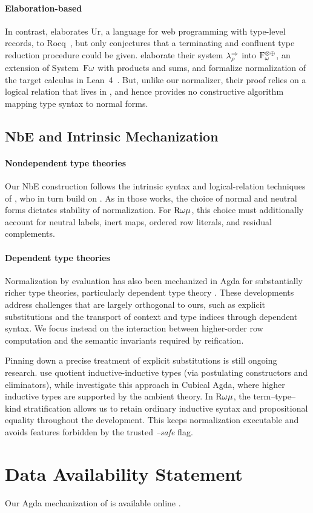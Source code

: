 \documentclass[sigplan,screen]{acmart}
\begin{document}
\paragraph{Elaboration-based} In contrast,  elaborates Ur, a language for web programming with type-level records, to Rocq~\citep{Rocq}, but only conjectures that a terminating and confluent type reduction procedure could be given.  elaborate their system $\lambda_{\rho}^{\Rightarrow}{}$ into $\textrm{F$_{\omega}^{\otimes\oplus}$}{}$, an extension of System~$\textrm{F$\omega$}$ with products and sums, and formalize normalization of the target calculus in Lean~4~\citep{Lean4}. But, unlike our normalizer, their proof relies on a logical relation that lives in , and hence provides no constructive algorithm mapping type syntax to normal forms. 

\subsection{NbE and Intrinsic Mechanization}

\paragraph{Nondependent type theories}
Our NbE construction follows the intrinsic syntax and logical-relation techniques of , who in turn build on . As in those works, the choice of normal and neutral forms dictates stability of normalization. For $\Rome$, this choice must additionally account for neutral labels, inert maps, ordered row literals, and residual complements.

\paragraph{Dependent type theories}
Normalization by evaluation has also been mechanized in Agda for substantially richer type theories, particularly dependent type theory \citep{Abel13,AbelC14,AbelAHPMSS19}. These developments address challenges that are largely orthogonal to ours, such as explicit substitutions and the transport of context and type indices through dependent syntax. We focus instead on the interaction between higher-order row computation and the semantic invariants required by reification. 

Pinning down a precise treatment of explicit substitutions is still ongoing research.  use quotient inductive-inductive types (via postulating constructors and eliminators), while  investigate this approach in Cubical Agda, where higher inductive types are supported by the ambient theory. In $\Rome$, the term--type--kind stratification allows us to retain ordinary inductive syntax and propositional equality throughout the development. This keeps normalization executable and avoids features forbidden by the trusted \emph{--safe} flag.
\fi

\section*{Data Availability Statement}
\label{sec:data}
Our Agda mechanization of \Rome{} is available online \citep{Artifact, GithubArtifact}.


\end{document}
